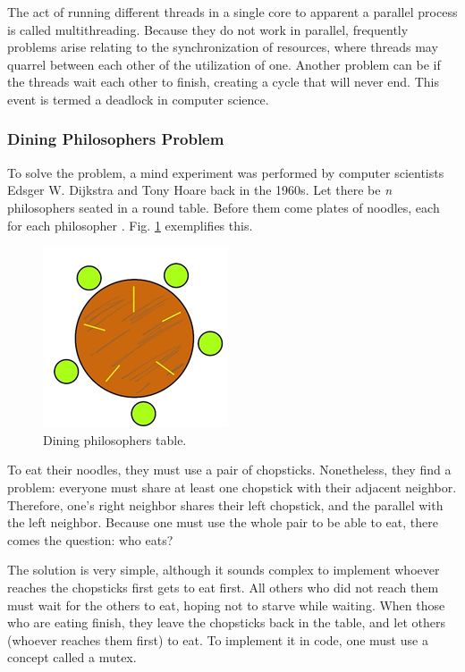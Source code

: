 \documentclass[12pt]{article}
\begin{document}
The act of running different threads in a single core to apparent a parallel process is called multithreading. Because they do not work in parallel, frequently problems arise relating to the synchronization of resources, where threads may quarrel between each other of the utilization of one. Another problem can be if the threads wait each other to finish, creating a cycle that will never end. This event is termed a deadlock in computer science.

\subsubsection{Dining Philosophers Problem}

To solve the problem, a mind experiment was performed by computer scientists Edsger W. Dijkstra and Tony Hoare back in the 1960s. Let there be \emph{n} philosophers seated in a round table. Before them come plates of noodles, each for each philosopher \cite{osbook}. Fig. \ref{fig:phil} exemplifies this.

\begin{figure}[ht]
\includegraphics{phil}
\centering
\caption{Dining philosophers table.}
\label{fig:phil}
\end{figure}

To eat their noodles, they must use a pair of chopsticks. Nonetheless, they find a problem: everyone must share at least one chopstick with their adjacent neighbor. Therefore, one’s right neighbor shares their left chopstick, and the parallel with the left neighbor. Because one must use the whole pair to be able to eat, there comes the question: who eats?

The solution is very simple, although it sounds complex to implement whoever reaches the chopsticks first gets to eat first. All others who did not reach them must wait for the others to eat, hoping not to starve while waiting. When those who are eating finish, they leave the chopsticks back in the table, and let others (whoever reaches them first) to eat. To implement it in code, one must use a concept called a mutex.
\end{document}

